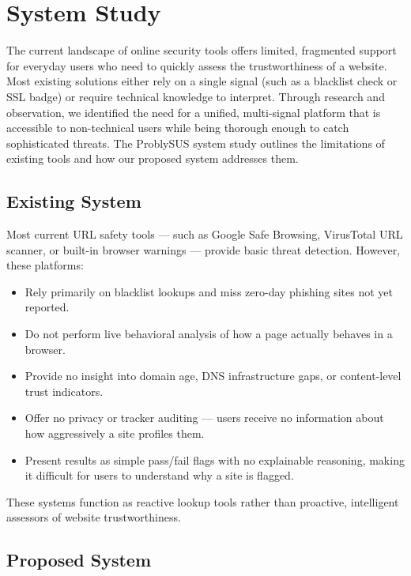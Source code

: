 \chapter{System Study}

The current landscape of online security tools offers limited, fragmented support for everyday users who need to quickly assess the trustworthiness of a website. Most existing solutions either rely on a single signal (such as a blacklist check or SSL badge) or require technical knowledge to interpret. Through research and observation, we identified the need for a unified, multi-signal platform that is accessible to non-technical users while being thorough enough to catch sophisticated threats. The ProblySUS system study outlines the limitations of existing tools and how our proposed system addresses them.

\section{Existing System}

Most current URL safety tools — such as Google Safe Browsing, VirusTotal URL scanner, or built-in browser warnings — provide basic threat detection. However, these platforms:

\begin{itemize}
\item Rely primarily on blacklist lookups and miss zero-day phishing sites not yet reported.
\item Do not perform live behavioral analysis of how a page actually behaves in a browser.
\item Provide no insight into domain age, DNS infrastructure gaps, or content-level trust indicators.
\item Offer no privacy or tracker auditing — users receive no information about how aggressively a site profiles them.
\item Present results as simple pass/fail flags with no explainable reasoning, making it difficult for users to understand why a site is flagged.
\end{itemize}

These systems function as reactive lookup tools rather than proactive, intelligent assessors of website trustworthiness.

\section{Proposed System}

